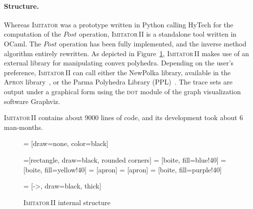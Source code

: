 \documentclass[a4paper,10pt]{article}
\newcommand{\apron}{\textsc{Apron}}
\newcommand{\gdot}{\textsc{dot}}
\newcommand{\graphviz}{Graphviz}
\newcommand{\hytech}{{\sc HyTech}}
\newcommand{\imitator}{\textsc{Imitator}}
\newcommand{\imitatordeux}{\textsc{Imitator}\,II}
\newcommand{\ocaml}{OCaml}
\newcommand{\polka}{NewPolka}
\newcommand{\python}{Python}
\newcommand{\paragraphe}[1]{\paragraph{#1.}}
\begin{document}
\paragraphe{Structure}
Whereas \imitator{} was a prototype written in \python{} calling \hytech{} for the computation of the $\mathit{Post}$ operation, \imitatordeux{} is a standalone tool written in \ocaml{}.
The $\mathit{Post}$ operation has been fully implemented, and the inverse method algorithm entirely rewritten.
As depicted in Figure~\ref{fig:structure}, \imitatordeux{} makes use of an external library for manipulating convex polyhedra.
Depending on the user's preference, \imitatordeux{} can call either the \polka{} library, available in the \apron{} library~\cite{jm09}, or the Parma Polyhedra Library (PPL)~\cite{bhz08}.
The trace sets are output under a graphical form using the \gdot{} module of the graph visualization software \graphviz{}.

\imitatordeux{} contains about 9000 lines of code, and its development took about 6 man-months.

\begin{figure}[ht!]
	 = [draw=none, color=black]
	
	=[rectangle, draw=black, rounded corners]
	 = [boite, fill=blue!40]
	 = [boite, fill=yellow!40]
	 = [apron]
	 = [apron]
	 = [boite, fill=purple!40]

	 = [->, draw=black, thick]
{

\centering


}

\caption{\imitatordeux{} internal structure}
\label{fig:structure}
\end{figure}
\end{document}
